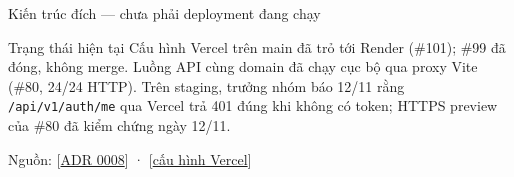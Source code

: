 \documentclass[aspectratio=169,10pt]{beamer}
\begin{document}
\begin{frame}{Kiến trúc đích — chưa phải deployment đang chạy}
  \centering
  \vspace{1em}
  \begin{alertblock}{Trạng thái hiện tại}
    Cấu hình Vercel trên main đã trỏ tới Render (\#101); \#99 đã đóng, không merge. Luồng API cùng domain đã chạy cục bộ qua proxy Vite (\#80, 24/24 HTTP). Trên staging, trưởng nhóm báo 12/11 rằng \texttt{/api/v1/auth/me} qua Vercel trả 401 đúng khi không có token; HTTPS preview của \#80 đã kiểm chứng ngày 12/11.
  \end{alertblock}
  \scriptsize Nguồn: [\href{https://github.com/Ktin06/it3180_nhom6_gym_management/blob/main/docs/decisions/0008-goi-api-cung-domain.md}{ADR 0008}] · [\href{https://github.com/Ktin06/it3180_nhom6_gym_management/blob/main/frontend/vercel.json}{cấu hình Vercel}]
\end{frame}
\end{document}
